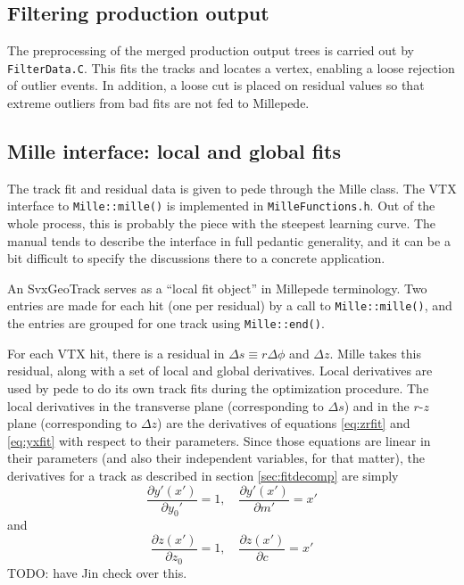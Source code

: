 \documentclass[12pt]{article}
\begin{document}
\subsection{Filtering production output}
The preprocessing of the merged production output trees is carried out by \texttt{FilterData.C}. This fits the tracks and locates a vertex, enabling a loose rejection of outlier events. In addition, a loose cut is placed on residual values so that extreme outliers from bad fits are not fed to Millepede.

\subsection{Mille interface: local and global fits}
The track fit and residual data is given to pede through the Mille class. The VTX interface to \texttt{Mille::mille()} is implemented in \texttt{MilleFunctions.h}. Out of the whole process, this is probably the piece with the steepest learning curve. The manual tends to describe the interface in full pedantic generality, and it can be a bit difficult to specify the discussions there to a concrete application.

An SvxGeoTrack serves as a ``local fit object'' in Millepede terminology. Two entries are made for each hit (one per residual) by a call to \texttt{Mille::mille()}, and the entries are grouped for one track using \texttt{Mille::end()}.

For each VTX hit, there is a residual in $\Delta s \equiv r\Delta\phi$ and $\Delta z$. Mille takes this residual, along with a set of local and global derivatives. Local derivatives are used by pede to do its own track fits during the optimization procedure. The local derivatives in the transverse plane (corresponding to $\Delta s$) and in the $r$-$z$ plane (corresponding to $\Delta z$) are the derivatives of equations \ref{eq:zrfit} and \ref{eq:yxfit} with respect to their parameters. Since those equations are linear in their parameters (and also their independent variables, for that matter), the derivatives for a track as described in section \ref{sec:fitdecomp} are simply
\begin{equation} \label{eq:sderlc}
\frac{\partial y'(x')}{\partial y_0'} = 1, \quad 
\frac{\partial y'(x')}{\partial m'} = x' 
\end{equation}
and
\begin{equation} \label{eq:zderlc}
\frac{\partial z(x')}{\partial z_0} = 1, \quad 
\frac{\partial z(x')}{\partial c} = x' 
\end{equation}
TODO: have Jin check over this.
\end{document}
